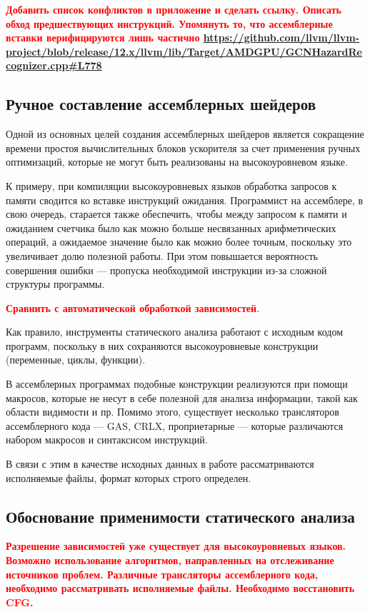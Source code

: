 \documentclass[a4paper,14pt]{extarticle}
\newcommand{\todo}[1]{\textbf{\textcolor{red}{#1}}}
\begin{document}
\todo{Добавить список конфликтов в приложение и сделать ссылку. Описать обход предшествующих инструкций.
Упомянуть то, что ассемблерные вставки верифицируются лишь частично \url{https://github.com/llvm/llvm-project/blob/release/12.x/llvm/lib/Target/AMDGPU/GCNHazardRecognizer.cpp\#L778}}

\subsection{Ручное составление ассемблерных шейдеров}

Одной из основных целей создания ассемблерных шейдеров является сокращение
времени простоя вычислительных блоков ускорителя за счет применения ручных оптимизаций,
которые не могут быть реализованы на высокоуровневом языке.

К примеру, при компиляции высокоуровневых языков обработка запросов к памяти сводится ко вставке
инструкций ожидания. Программист на ассемблере, в свою очередь, старается также обеспечить,
чтобы между запросом к памяти и ожиданием счетчика было как можно больше несвязанных
арифметических операций, а ожидаемое значение было как можно более точным, поскольку
это увеличивает долю полезной работы. При этом повышается вероятность совершения
ошибки — пропуска необходимой инструкции из-за сложной структуры программы.

\todo{Сравнить с автоматической обработкой зависимостей}.

Как правило, инструменты статического анализа работают с исходным кодом программ,
поскольку в них сохраняются высокоуровневые конструкции (переменные, циклы, функции).

В ассемблерных программах подобные конструкции реализуются при помощи макросов,
которые не несут в себе полезной для анализа информации, такой как области видимости и пр.
Помимо этого, существует несколько трансляторов ассемблерного кода — GAS, CRLX, проприетарные — которые
различаются набором макросов и синтаксисом инструкций.

В связи с этим в качестве исходных данных в работе рассматриваются исполняемые файлы,
формат которых строго определен.

\subsection{Обоснование применимости статического анализа}

\todo{Разрешение зависимостей уже существует для высокоуровневых языков. Возможно использование алгоритмов, направленных на отслеживание источников проблем. Различные трансляторы ассемблерного кода, необходимо рассматривать исполняемые файлы. Необходимо восстановить CFG.}
\end{document}
